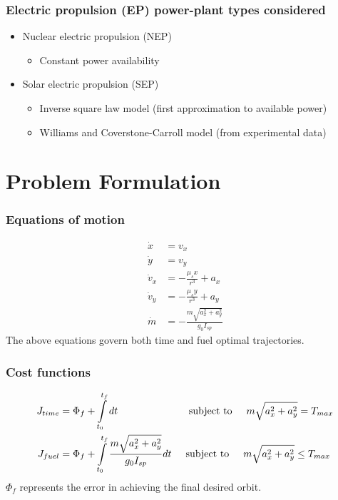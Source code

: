 \documentclass{beamer}
\begin{document}
\begin{frame}
	\frametitle{Electric propulsion (EP) power-plant types considered}
	\begin{itemize}
		\item Nuclear electric propulsion (NEP) 
		\begin{itemize}
			\item Constant power availability
		\end{itemize}
		\item Solar electric propulsion (SEP)
		\begin{itemize}
			\item Inverse square law model (first approximation to available power)
			\item Williams and Coverstone-Carroll model (from experimental data)
		\end{itemize}
	\end{itemize}
\end{frame}


\section{Problem Formulation}
\begin{frame}
	\frametitle{Equations of motion}
	\begin{align}
		\dot{x}&=v_x\\
		\dot{y}&=v_y\\
		\dot{v}_x&=-\frac{\mu_s x}{r^3}+a_x\\
		\dot{v}_y&=-\frac{\mu_s y}{r^3}+a_y\\
		\dot{m}&=-\frac{m\sqrt{a_x^2+a_y^2}}{g_0I_{sp}}
	\end{align}
	The above equations govern both time and fuel optimal trajectories.
\end{frame}

\begin{frame}
\frametitle{Cost functions}
\begin{align}
J_{time}&=\Phi_f+\int\limits_{t_0}^{t_f}dt \hspace{25mm}\text{subject to}\hspace{5mm} m\sqrt{a_x^2+a_y^2}=T_{max}\\
J_{fuel}&=\Phi_f+\int\limits_{t_0}^{t_f}\frac{m\sqrt{a_x^2+a_y^2}}{g_0I_{sp}}dt \hspace{5mm}\text{subject to}\hspace{5mm} m\sqrt{a_x^2+a_y^2}\leq T_{max}
\end{align}
$\Phi_f$ represents the error in achieving the final desired orbit.
\end{frame}
\end{document}
